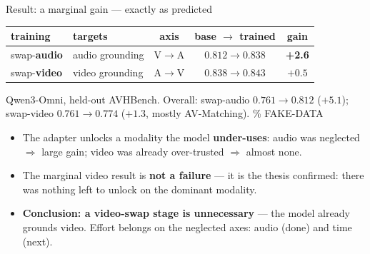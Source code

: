 \documentclass[aspectratio=169,11pt]{beamer}
\begin{document}
\begin{frame}{Result: a marginal gain --- exactly as predicted}
\centering
\renewcommand{\arraystretch}{1.25}
\small
\begin{tabular}{l l c c c}
\toprule
training & targets & axis & base $\to$ trained & gain \\
\midrule
swap-\textbf{audio} & audio grounding & V$\to$A & $0.812 \to 0.838$ & \textcolor{trn}{\textbf{+2.6}} \\
swap-\textbf{video} & video grounding & A$\to$V & $0.838 \to 0.843$ & $+0.5$ \\ %
\bottomrule
\end{tabular}
\par\vspace{0.3em}
{\scriptsize Qwen3-Omni, held-out AVHBench. Overall: swap-audio $0.761\to0.812$ ($+5.1$);
swap-video $0.761\to0.774$ ($+1.3$, mostly AV-Matching). \% FAKE-DATA}
\vfill
\begin{itemize}\small
\item The adapter unlocks a modality the model \textbf{under-uses}: audio was neglected $\Rightarrow$
large gain; video was already over-trusted $\Rightarrow$ almost none.
\item The marginal video result is \textbf{not a failure} --- it is the thesis confirmed: there was
nothing left to unlock on the dominant modality.
\item \textbf{Conclusion: a video-swap stage is unnecessary} --- the model already grounds video.
Effort belongs on the neglected axes: audio (done) and time (next).
\end{itemize}
\end{frame}
\end{document}
